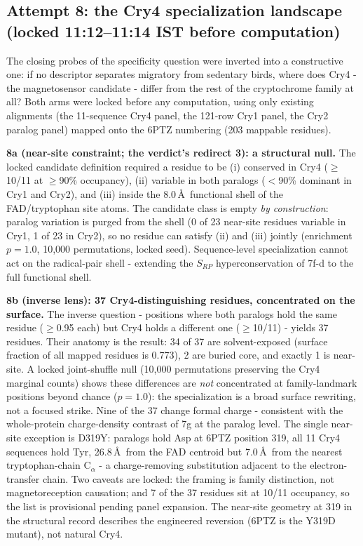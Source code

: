 \documentclass[12pt,a4paper]{article}
\begin{document}
\subsection{Attempt 8: the Cry4 specialization landscape (locked 11:12--11:14 IST before computation)}
The closing probes of the specificity question were inverted into a constructive one: if no descriptor separates migratory from sedentary birds, where does Cry4 - the magnetosensor candidate - differ from the rest of the cryptochrome family at all? Both arms were locked before any computation, using only existing alignments (the 11-sequence Cry4 panel, the 121-row Cry1 panel, the Cry2 paralog panel) mapped onto the 6PTZ numbering (203 mappable residues).

\textbf{8a (near-site constraint; the verdict's redirect 3): a structural null.} The locked candidate definition required a residue to be (i) conserved in Cry4 ($\geq$10/11 at $\geq$90\% occupancy), (ii) variable in both paralogs ($<$90\% dominant in Cry1 and Cry2), and (iii) inside the 8.0\,\AA\ functional shell of the FAD/tryptophan site atoms. The candidate class is empty \emph{by construction}: paralog variation is purged from the shell (0 of 23 near-site residues variable in Cry1, 1 of 23 in Cry2), so no residue can satisfy (ii) and (iii) jointly (enrichment $p=1.0$, 10{,}000 permutations, locked seed). Sequence-level specialization cannot act on the radical-pair shell - extending the $S_{RP}$ hyperconservation of 7f-d to the full functional shell.

\textbf{8b (inverse lens): 37 Cry4-distinguishing residues, concentrated on the surface.} The inverse question - positions where both paralogs hold the same residue ($\geq$0.95 each) but Cry4 holds a different one ($\geq$10/11) - yields 37 residues. Their anatomy is the result: 34 of 37 are solvent-exposed (surface fraction of all mapped residues is 0.773), 2 are buried core, and exactly 1 is near-site. A locked joint-shuffle null (10{,}000 permutations preserving the Cry4 marginal counts) shows these differences are \emph{not} concentrated at family-landmark positions beyond chance ($p=1.0$): the specialization is a broad surface rewriting, not a focused strike. Nine of the 37 change formal charge - consistent with the whole-protein charge-density contrast of 7g at the paralog level. The single near-site exception is D319Y: paralogs hold Asp at 6PTZ position 319, all 11 Cry4 sequences hold Tyr, 26.8\,\AA\ from the FAD centroid but 7.0\,\AA\ from the nearest tryptophan-chain C$_\alpha$ - a charge-removing substitution adjacent to the electron-transfer chain. Two caveats are locked: the framing is family distinction, not magnetoreception causation; and 7 of the 37 residues sit at 10/11 occupancy, so the list is provisional pending panel expansion. The near-site geometry at 319 in the structural record describes the engineered reversion (6PTZ is the Y319D mutant), not natural Cry4.
\end{document}
